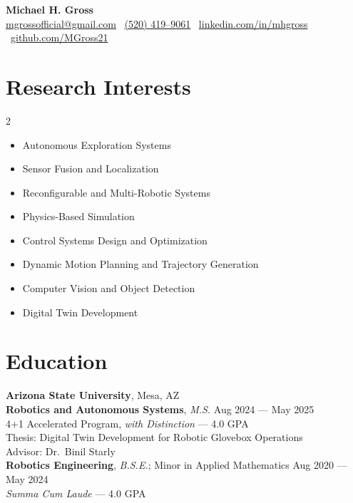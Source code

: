 \documentclass[10pt]{article}
\begin{document}

\begin{center}
    {\LARGE \textbf{Michael H. Gross}} \\
    \href{mailto:mgrossofficial@gmail.com}{mgrossofficial@gmail.com} \textbar\ \href{tel:+15204199061}{(520) 419--9061} \textbar\
    \href{https://www.linkedin.com/in/mhgross}{linkedin.com/in/mhgross} \textbar\ \href{https://github.com/MGross21}{github.com/MGross21}
\end{center}

\section*{Research Interests}
\vspace{-0.3em}
\begin{multicols}{2}
  \begin{itemize}[leftmargin=1.2em]
    \item Autonomous Exploration Systems
    \item Sensor Fusion and Localization
    \item Reconfigurable and Multi-Robotic Systems
    \item Physics-Based Simulation
    \item Control Systems Design and Optimization
    \item Dynamic Motion Planning and Trajectory Generation
    \item Computer Vision and Object Detection
    \item Digital Twin Development
  \end{itemize}
\end{multicols}
\vspace{-0.5em}

\section*{Education}
\textbf{Arizona State University}, Mesa, AZ\\
\textbf{Robotics and Autonomous Systems}, \textit{M.S.} \hfill Aug 2024 --- May 2025\\
4+1 Accelerated Program, \textit{with Distinction} --- 4.0 GPA\\
Thesis: Digital Twin Development for Robotic Glovebox Operations\\
Advisor: Dr.\ Binil Starly \\

\textbf{Robotics Engineering}, \textit{B.S.E.}; Minor in Applied Mathematics \hfill Aug 2020 --- May 2024\\
\textit{Summa Cum Laude} --- 4.0 GPA
\end{document}
